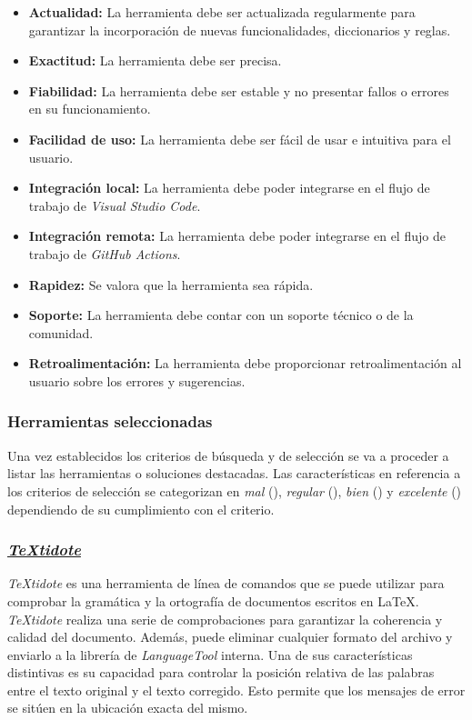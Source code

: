\begin{itemize}
    \item \textbf{Actualidad:} La herramienta debe ser actualizada regularmente para garantizar la incorporación de nuevas funcionalidades, diccionarios y reglas.
    \item \textbf{Exactitud:} La herramienta debe ser precisa.
    \item \textbf{Fiabilidad:} La herramienta debe ser estable y no presentar fallos o errores en su funcionamiento.
    \item \textbf{Facilidad de uso:} La herramienta debe ser fácil de usar e intuitiva para el usuario.
    \item \textbf{Integración local:} La herramienta debe poder integrarse en el flujo de trabajo de \textit{Visual Studio Code}.
    \item \textbf{Integración remota:} La herramienta debe poder integrarse en el flujo de trabajo de \textit{GitHub Actions}.
    \item \textbf{Rapidez:} Se valora que la herramienta sea rápida.
    \item \textbf{Soporte:} La herramienta debe contar con un soporte técnico o de la comunidad.
    \item \textbf{Retroalimentación:} La herramienta debe proporcionar retroalimentación al usuario sobre los errores y sugerencias.
\end{itemize}

\subsubsection{Herramientas seleccionadas}

Una vez establecidos los criterios de búsqueda y de selección se va a proceder a listar las herramientas o soluciones destacadas. Las características en referencia a los criterios de selección se categorizan en \textit{mal} (\mal), \textit{regular} (\regular), \textit{bien} (\bien) y \textit{excelente} (\esp) dependiendo de su cumplimiento con el criterio.

\subsubsection{\href{https://github.com/sylvainhalle/textidote}{\textit{TeXtidote}}}

\textit{TeXtidote} es una herramienta de línea de comandos que se puede utilizar para comprobar la gramática y la ortografía de documentos escritos en LaTeX. \textit{TeXtidote} realiza una serie de comprobaciones para garantizar la coherencia y calidad del documento. Además, puede eliminar cualquier formato del archivo y enviarlo a la librería de \textit{LanguageTool} interna. Una de sus características distintivas es su capacidad para controlar la posición relativa de las palabras entre el texto original y el texto corregido. Esto permite que los mensajes de error se sitúen en la ubicación exacta del mismo.


